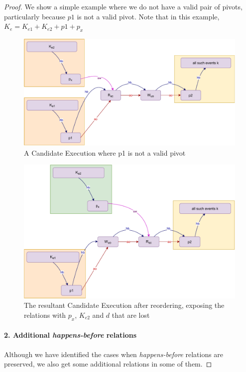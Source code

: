 \begin{proof}
        We show a simple example where we do not have a valid pair of pivots, particularly because $p1$ is not a valid pivot. Note that in this example, $K_e = K_{e1} + K_{e2} + p1 + p_x$
        \begin{figure}[H]
            \centering
            \includegraphics[scale=0.7]{Q1(e).pdf}
            \caption{A Candidate Execution where p1 is not a valid pivot}
            \label{fig:my_label}
        \end{figure}
        
         \begin{figure}[H]
            \centering
            \includegraphics[scale=0.7]{Q1(f).pdf}
            \caption{The resultant Candidate Execution after reordering, exposing the relations with $p_x$, $K_{e2}$ and $d$ that are lost}
            \label{fig:my_label}
        \end{figure}
        
            
        \paragraph{2. Additional \textit{happens-before} relations}
        Although we have identified the cases when \textit{happens-before} relations are preserved, we also get some additional relations in some of them.
        

\end{proof}
